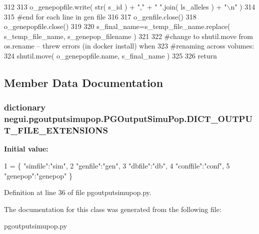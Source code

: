 \begin{DoxyCode}
312 
313             o\_genepopfile.write( str( s\_id ) + \textcolor{stringliteral}{","} +  \textcolor{stringliteral}{" "}.join( ls\_alleles ) + \textcolor{stringliteral}{"\(\backslash\)n"}  )
314 
315         \textcolor{comment}{#end for each line in gen file}
316 
317         o\_genfile.close()
318         o\_genepopfile.close()
319 
320         s\_final\_name=s\_temp\_file\_name.replace( s\_temp\_file\_name, s\_genepop\_filename )
321 
322         \textcolor{comment}{#change to shutil.move from os.rename -- threw errors (in docker install) when}
323         \textcolor{comment}{#renaming across volumes:}
324         shutil.move( o\_genepopfile.name, s\_final\_name )
325 
326         \textcolor{keywordflow}{return}
\end{DoxyCode}


\subsection{Member Data Documentation}
\subsubsection[{\texorpdfstring{D\+I\+C\+T\+\_\+\+O\+U\+T\+P\+U\+T\+\_\+\+F\+I\+L\+E\+\_\+\+E\+X\+T\+E\+N\+S\+I\+O\+NS}{DICT_OUTPUT_FILE_EXTENSIONS}}]{\setlength{\rightskip}{0pt plus 5cm}dictionary negui.\+pgoutputsimupop.\+P\+G\+Output\+Simu\+Pop.\+D\+I\+C\+T\+\_\+\+O\+U\+T\+P\+U\+T\+\_\+\+F\+I\+L\+E\+\_\+\+E\+X\+T\+E\+N\+S\+I\+O\+NS\hspace{0.3cm}{\ttfamily [static]}}\hypertarget{classnegui_1_1pgoutputsimupop_1_1PGOutputSimuPop_a9c9afd31cd09eedc7187eaf6a48ef74a}{}\label{classnegui_1_1pgoutputsimupop_1_1PGOutputSimuPop_a9c9afd31cd09eedc7187eaf6a48ef74a}
{\bfseries Initial value\+:}
\begin{DoxyCode}
1 = \{ \textcolor{stringliteral}{"simfile"}:\textcolor{stringliteral}{"sim"},
2                                     \textcolor{stringliteral}{"genfile"}:\textcolor{stringliteral}{"gen"},
3                                     \textcolor{stringliteral}{"dbfile"}:\textcolor{stringliteral}{"db"},
4                                     \textcolor{stringliteral}{"conffile"}:\textcolor{stringliteral}{"conf"},
5                                     \textcolor{stringliteral}{"genepop"}:\textcolor{stringliteral}{"genepop"} \}
\end{DoxyCode}


Definition at line 36 of file pgoutputsimupop.\+py.



The documentation for this class was generated from the following file\+:\begin{DoxyCompactItemize}
\item 
pgoutputsimupop.\+py\end{DoxyCompactItemize}
